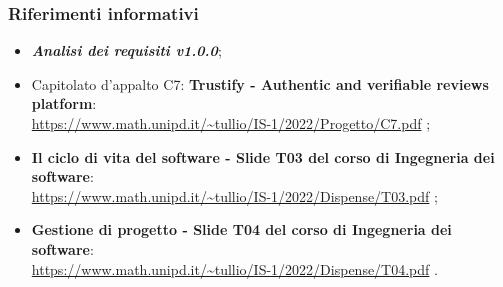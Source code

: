 \subsubsection{Riferimenti informativi}
\begin{itemize}
    \item \textbf{\textit{Analisi dei requisiti v1.0.0}};
    \item Capitolato d'appalto C7: \textbf{Trustify - Authentic and verifiable reviews platform}: \\
          \url{https://www.math.unipd.it/~tullio/IS-1/2022/Progetto/C7.pdf} \hfill{};
    \item \textbf{Il ciclo di vita del software - Slide T03 del corso di Ingegneria dei software}: \\
          \url{https://www.math.unipd.it/~tullio/IS-1/2022/Dispense/T03.pdf} \hfill{};
    \item \textbf{Gestione di progetto - Slide T04 del corso di Ingegneria dei software}: \\
          \url{https://www.math.unipd.it/~tullio/IS-1/2022/Dispense/T04.pdf} \hfill{}.
\end{itemize}
